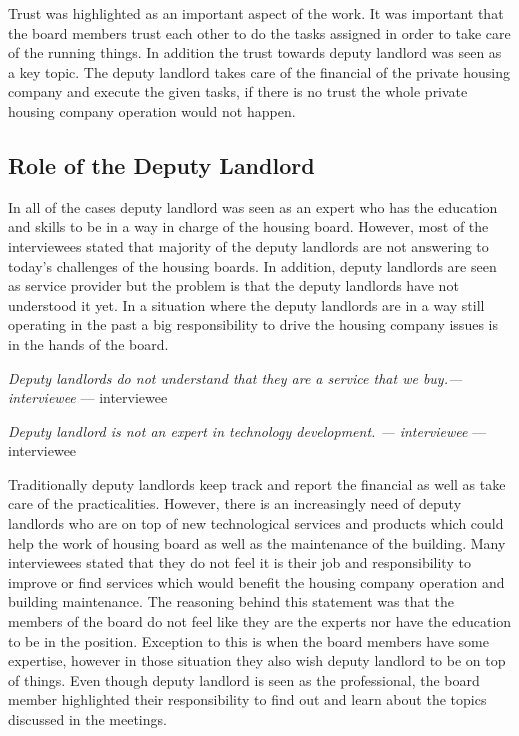 Trust was highlighted as an important aspect of the work. It was important that the board members trust each other to do the tasks assigned in order to take care of the running things. In addition the trust towards deputy landlord was seen as a key topic. The deputy landlord takes care of the financial of the private housing company and execute the given tasks, if there is no trust the whole private housing company operation would not happen.

\subsection{Role of the Deputy Landlord}

In all of the cases deputy landlord was seen as an expert who has the education and skills to be in a way in charge of the housing board. However, most of the interviewees stated that majority of the deputy landlords are not answering to today's challenges of the housing boards. In addition, deputy landlords are seen as service provider but the problem is that the deputy landlords have not understood it yet. In a situation where the deputy landlords are in a way still operating in the past a big responsibility to drive the housing company issues is in the hands of the board.

\begin{displayquote}
\textit{Deputy landlords do not understand that they are a service that
we buy.— interviewee} --- interviewee
\end{displayquote}

\begin{displayquote}
\textit{Deputy landlord is not an expert in technology development. —
interviewee} --- interviewee
\end{displayquote}

Traditionally deputy landlords keep track and report the financial as well as take care of the practicalities. However, there is an increasingly need of deputy landlords who are on top of new technological services and products which could help the work of housing board as well as the maintenance of the building. Many interviewees stated that they do not feel it is their job and responsibility to improve or find services which would benefit the housing company operation and building maintenance. The reasoning behind this statement was that the members of the board do not feel like they are the experts nor have the education to be in the position. Exception to this is when the board members have some expertise, however in those situation they also wish deputy landlord to be on top of things. Even though deputy landlord is seen as the professional, the board member highlighted their responsibility to find out and learn about the topics discussed in the meetings.

